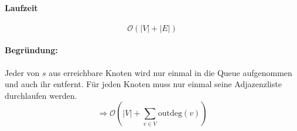 \paragraph{Laufzeit}
\[ \mathcal{O}(|V|+|E|) \]
\paragraph{Begründung:}
Jeder von $s$ aus erreichbare Knoten wird nur einmal in die Queue aufgenommen und auch ihr entfernt. Für jeden Knoten muss nur einmal seine Adjazenzliste durchlaufen werden.
\[  \Rightarrow \mathcal{O}\left(|V|+\sum_{v \in V}\text{outdeg}(v) \right) \]

\clearpage